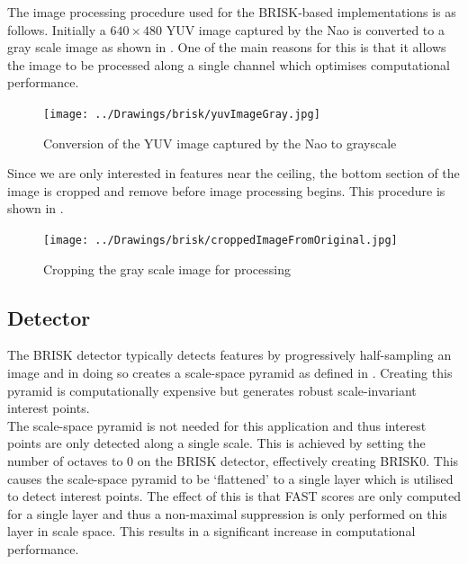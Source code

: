\documentclass[11pt]{report}
\begin{document}
The image processing procedure used for the BRISK-based implementations is as follows. Initially a $640 \times 480$ YUV image captured by the Nao is converted to a gray scale image as shown in . One of the main reasons for this is that it allows the image to be processed along a single channel which optimises computational performance. \\

\begin{figure}[h!] 
  \centering
    \texttt{[image: ../Drawings/brisk/yuvImageGray.jpg]}
    \caption{Conversion of the YUV image captured by the Nao to grayscale}
    \label{fig:colourGrayscale}
\end{figure}

Since we are only interested in features near the ceiling, the bottom section of the image is cropped and remove before image processing begins. This procedure is shown in .\\

\begin{figure}[h!] 
  \centering
    \texttt{[image: ../Drawings/brisk/croppedImageFromOriginal.jpg]}
    \caption{Cropping the gray scale image for processing}
    \label{fig:cropImage}
\end{figure}

\subsection{Detector}
\label{sec:BRISK0Detect}
The BRISK detector typically detects features by progressively half-sampling an image and in doing so creates a scale-space pyramid as defined in . Creating this pyramid is computationally expensive but generates robust scale-invariant interest points.\\

The scale-space pyramid is not needed for this application and thus interest points are only detected along a single scale. This is achieved by setting the number of octaves to $0$ on the BRISK detector, effectively creating BRISK0. This causes the scale-space pyramid to be `flattened' to a single layer which is utilised to detect interest points. The effect of this is that FAST scores are only computed for a single layer and thus a non-maximal suppression is only performed on this layer in scale space. This results in a significant increase in computational performance. \\
\end{document}
